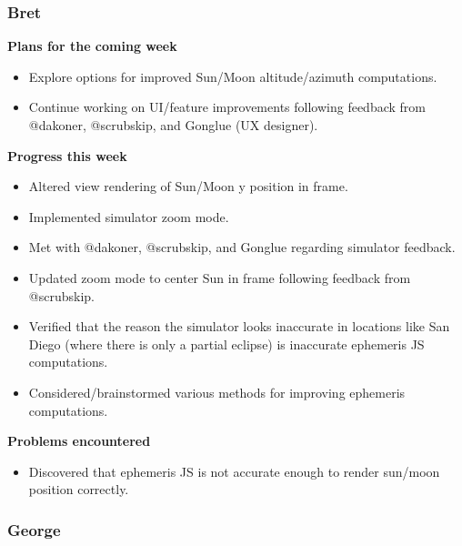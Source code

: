 \documentclass[10pt, onecolumn, draftclsnofoot, letterpaper, compsoc]{IEEEtran}
\begin{document}
    \subsubsection{Bret}

    \noindent \textbf{Plans for the coming week}

    \begin{itemize}

    \item Explore options for improved Sun/Moon altitude/azimuth computations.
    \item Continue working on UI/feature improvements following feedback from @dakoner, @scrubskip, and Gonglue (UX
      designer).

    \end{itemize}

    \noindent \textbf{Progress this week}

    \begin{itemize}

    \item Altered view rendering of Sun/Moon y position in frame.
    \item Implemented simulator zoom mode.
    \item Met with @dakoner, @scrubskip, and Gonglue regarding simulator feedback.
    \item Updated zoom mode to center Sun in frame following feedback from @scrubskip.
    \item Verified that the reason the simulator looks inaccurate in locations like San Diego (where there is only a
      partial eclipse) is inaccurate ephemeris JS computations.
    \item Considered/brainstormed various methods for improving ephemeris computations.

    \end{itemize}

    \noindent \textbf{Problems encountered}

    \begin{itemize}

    \item Discovered that ephemeris JS is not accurate enough to render sun/moon position correctly.

    \end{itemize}

    \subsubsection{George}
\end{document}
